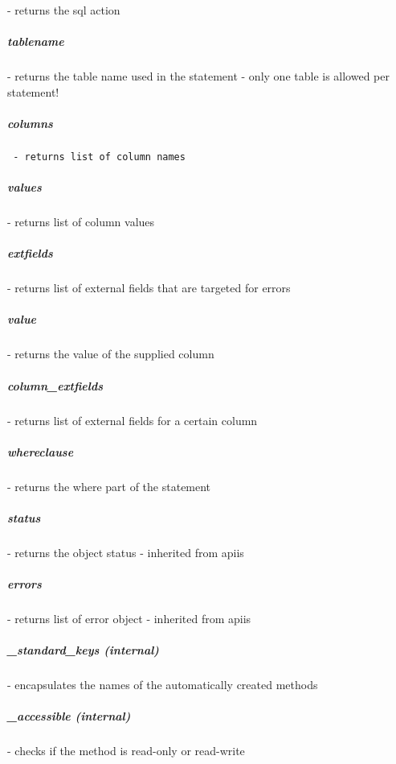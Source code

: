 - returns the sql action

\subparagraph*{tablename\label{PseudoStatement_tablename}}


- returns the table name used in the statement - only one table is allowed per statement!

\subparagraph*{columns\label{PseudoStatement_columns}}
\begin{verbatim}
 - returns list of column names
\end{verbatim}
\subparagraph*{values\label{PseudoStatement_values}}


- returns list of column values

\subparagraph*{extfields\label{PseudoStatement_extfields}}


- returns list of external fields that are targeted for errors

\subparagraph*{value\label{PseudoStatement_value}}


- returns the value of the supplied column

\subparagraph*{column\_extfields\label{PseudoStatement_column_extfields}}


- returns list of external fields for a certain column

\subparagraph*{whereclause\label{PseudoStatement_whereclause}}


- returns the where part of the statement

\subparagraph*{status\label{PseudoStatement_status}}


- returns the object status - inherited from apiis

\subparagraph*{errors\label{PseudoStatement_errors}}


- returns list of error object - inherited from apiis

\subparagraph*{\_standard\_keys (internal)\label{PseudoStatement__standard_keys_internal_}}


- encapsulates the names of the automatically created methods

\subparagraph*{\_accessible (internal)\label{PseudoStatement__accessible_internal_}}


- checks if the method is read-only or read-write


